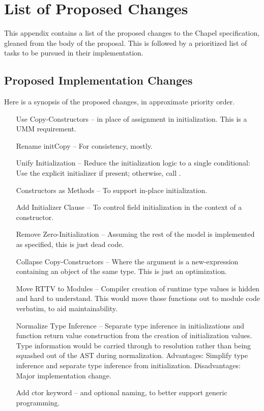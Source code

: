 \section{List of Proposed Changes}
\label{Changes}

This appendix contains a list of the proposed changes to the Chapel specification,
gleaned from the body of the proposal.  This is followed by a prioritized list of tasks to
be pursued in their implementation.

\subsection{Proposed Implementation Changes}

Here is a synopsis of the proposed changes, in approximate priority order.

\begin{itemize}
\item[Use Copy-Constructors] -- in place of assignment in initialization.  This is a UMM requirement.
\item[Rename initCopy] -- For consistency, mostly.
\item[Unify Initialization] -- Reduce the initialization logic to a single conditional:
  Use the explicit initializer if present; otherwise, call .
\item[Constructors as Methods] -- To support in-place initialization.
\item[Add Initializer Clause] -- To control field initialization in the context of a
  constructor.
\item[Remove Zero-Initialization] -- Assuming the rest of the model is implemented as
  specified, this is just dead code.
\item[Collapse Copy-Constructors] -- Where the argument is a new-expression containing
  an object of the same type.  This is just an optimization.
\item[Move RTTV to Modules] -- Compiler creation of runtime type values is hidden and hard
  to understand.  This would move those functions out to module code verbatim, to aid
  maintainability.
\item[Normalize Type Inference] -- Separate type inference in initializations and function
  return value construction from the creation of initialization values.  Type information
  would be carried through to resolution rather than being squashed out of the AST during
  normalization.  Advantages: Simplify type inference and separate type inference from
  initialization.  Disadvantages: Major implementation change.
\item[Add ctor keyword] -- and optional naming, to better support generic
  programming.
\end{itemize}

